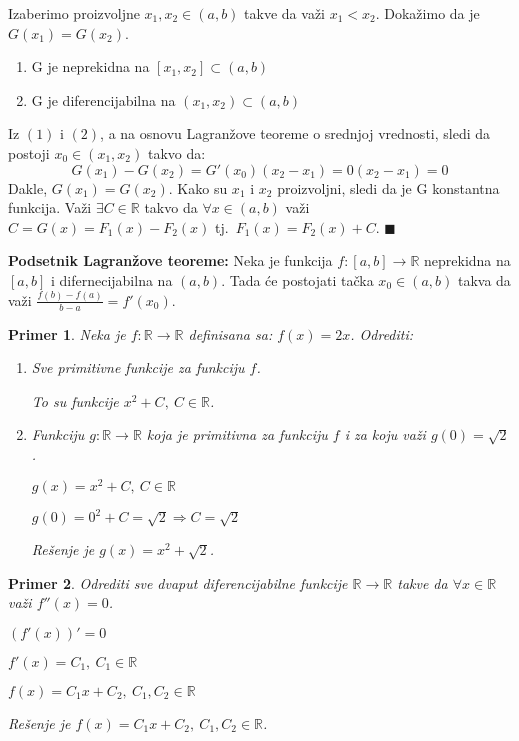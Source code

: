 \documentclass{article}
\newtheorem{prim}{Primer}[section]
\begin{document}
Izaberimo proizvoljne $x_1, x_2 \in (a, b)$ takve da važi
$x_1 < x_2$. Dokažimo da je $G(x_1) = G(x_2)$.
\begin{enumerate}[label=(\arabic*)]
    \item G je neprekidna na $[x_1, x_2] \subset (a, b)$
    \item G je diferencijabilna na $(x_1, x_2) \subset (a, b)$
\end{enumerate}
Iz $(1)$ i $(2)$, a na osnovu Lagranžove teoreme o srednjoj vrednosti,
sledi da postoji $x_0 \in (x_1, x_2)$ takvo da:
$$G(x_1) - G(x_2) = G'(x_0)(x_2-x_1) = 0  (x_2-x_1) = 0$$
Dakle, $G(x_1) = G(x_2)$. Kako su $x_1$ i $x_2$
proizvoljni, sledi da je G konstantna funkcija. Važi
$\exists C\in\mathbb{R}$ takvo da  $\forall x \in (a, b)$ važi
$C=G(x) =F_1(x) - F_2(x)$ tj.\ $F_1(x) = F_2(x) + C$.
\null\hfill $\blacksquare$ \par

\begin{teoremabox}
    \textbf{Podsetnik Lagranžove teoreme:} Neka je funkcija
    $f : [a,b]\rightarrow\mathbb{R}$ neprekidna na $[a,b]$
    i difernecijabilna na $(a,b)$. Tada će
    postojati tačka $x_0\in(a,b)$ takva da važi
    $\frac{f(b)-f(a)}{b-a}=f'(x_0)$.
\end{teoremabox}


\begin{primbox}
    \begin{prim}
        Neka je $f: \mathbb{R} \longrightarrow \mathbb{R}$
        definisana sa: $f(x) = 2x$. Odrediti:
        \begin{enumerate}[label=\alph*)]
            \item Sve primitivne funkcije za funkciju $f$.\par
                  To su funkcije $x^2 + C,\  C \in \mathbb{R}$.
            \item Funkciju $g: \mathbb{R} \longrightarrow \mathbb{R}$
                  koja je primitivna za funkciju $f$ i za koju važi
                  $g(0) = \sqrt{2}$.\par
                  $g(x) = x^2 + C,\ C \in \mathbb{R}$\par
                  $g(0) = 0^2 + C = \sqrt{2} \Rightarrow C = \sqrt{2}$\par
                  Rešenje je $g(x) = x^2 + \sqrt{2}$.
        \end{enumerate}
    \end{prim}
\end{primbox}


\begin{primbox}
    \begin{prim}
        Odrediti sve dvaput diferencijabilne funkcije
        $\mathbb{R} \longrightarrow \mathbb{R}$ takve da
        $\forall x \in \mathbb{R}$ važi $f''(x) = 0$.\par
        $(f'(x))' = 0$\par
        $f'(x) = C_1,\  C_1 \in \mathbb{R}$ \par
        $f(x) = C_1x+C_2,\ C_1,C_2 \in \mathbb{R}$ \par
        Rešenje je $f(x) = C_1x + C_2,\ C_1, C_2 \in \mathbb{R}$.
    \end{prim}
\end{primbox}
\end{document}
